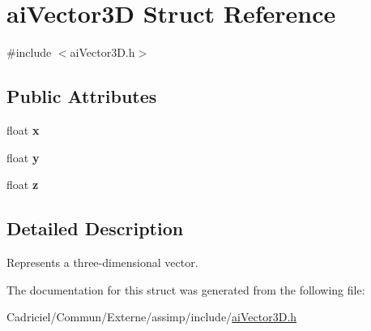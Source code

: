 \hypertarget{structai_vector3_d}{\section{ai\-Vector3\-D Struct Reference}
\label{structai_vector3_d}
}


{\ttfamily \#include $<$ai\-Vector3\-D.\-h$>$}

\subsection*{Public Attributes}
\begin{DoxyCompactItemize}
\item 
\hypertarget{structai_vector3_d_a3762d39eeb99def9ebd413b2bb8dd470}{float {\bfseries x}}\label{structai_vector3_d_a3762d39eeb99def9ebd413b2bb8dd470}

\item 
\hypertarget{structai_vector3_d_ac7b5fcc03324f8c3bc8429c95882dfb8}{float {\bfseries y}}\label{structai_vector3_d_ac7b5fcc03324f8c3bc8429c95882dfb8}

\item 
\hypertarget{structai_vector3_d_a2b93b892064995e8d24f4e3352175aae}{float {\bfseries z}}\label{structai_vector3_d_a2b93b892064995e8d24f4e3352175aae}

\end{DoxyCompactItemize}


\subsection{Detailed Description}
Represents a three-\/dimensional vector. 

The documentation for this struct was generated from the following file\-:\begin{DoxyCompactItemize}
\item 
Cadriciel/\-Commun/\-Externe/assimp/include/\hyperlink{ai_vector3_d_8h}{ai\-Vector3\-D.\-h}\end{DoxyCompactItemize}
